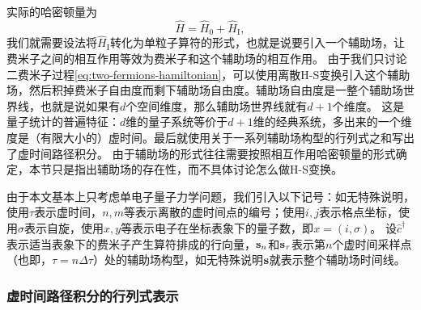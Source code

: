 \documentclass[hyperref, UTF8, a4paper]{ctexart}
\begin{document}
实际的哈密顿量为
\[
    \hat{H} = \hat{H}_0 + \hat{H}_\text{I}, 
\]
我们就需要设法将$\hat{H}_\text{I}$转化为单粒子算符的形式，也就是说要引入一个辅助场，让费米子之间的相互作用等效为费米子和这个辅助场的相互作用。
由于我们只讨论二费米子过程\eqref{eq:two-fermions-hamiltonian}，可以使用离散H-S变换引入这个辅助场，然后积掉费米子自由度而剩下辅助场自由度。辅助场自由度是一整个辅助场世界线，也就是说如果有$d$个空间维度，那么辅助场世界线就有$d+1$个维度。
这是量子统计的普遍特征：$d$维的量子系统等价于$d+1$维的经典系统，多出来的一个维度是（有限大小的）虚时间。最后就使用关于一系列辅助场构型的行列式之和写出了虚时间路径积分。
由于辅助场的形式往往需要按照相互作用哈密顿量的形式确定，本节只是指出辅助场的存在性，而不具体讨论怎么做H-S变换。

由于本文基本上只考虑单电子量子力学问题，我们引入以下记号：如无特殊说明，使用$\tau$表示虚时间，$n, m$等表示离散的虚时间点的编号；使用$i, j$表示格点坐标，使用$\sigma$表示自旋，使用$x, y$等表示电子在坐标表象下的量子数，即$x=(i, \sigma)$。
设$\hat{c}^\dagger$表示适当表象下的费米子产生算符排成的行向量，$\vb{s}_n$和$\vb{s}_\tau$表示第$n$个虚时间采样点（也即，$\tau=n\Delta \tau$）处的辅助场构型，如无特殊说明$\vb{s}$就表示整个辅助场时间线。

\subsubsection{虚时间路径积分的行列式表示}
\end{document}

